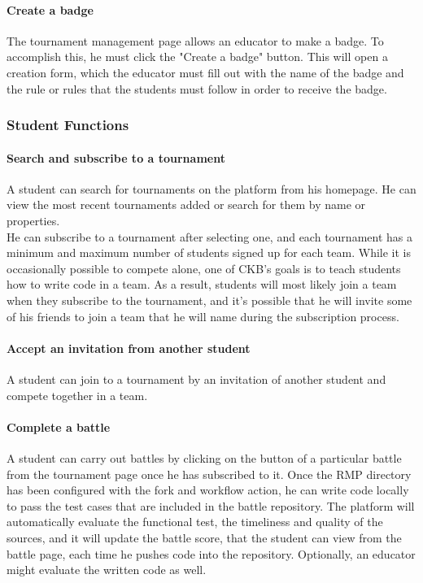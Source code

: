 \paragraph{Create a badge}
The tournament management page allows an educator to make a badge. To accomplish this, he must click the "Create a badge" button. This will open a creation form, which the educator must fill out with the name of the badge and the rule 
or rules that the students must follow in order to receive the badge.

\subsubsection{Student Functions}

\paragraph{Search and subscribe to a tournament}
A student can search for tournaments on the platform from his homepage. He can view the most recent tournaments added or search for them by name or properties.\\
He can subscribe to a tournament after selecting one, and each tournament has a minimum and maximum number of students signed up for each team. While it is occasionally possible to compete alone, one of CKB's goals is to teach 
students how to write code in a team. As a result, students will most likely join a team when they subscribe to the tournament, and it's possible that he will invite some of his friends to join a team that he will name during the 
subscription process.

\paragraph{Accept an invitation from another student}
A student can join to a tournament by an invitation of another student and compete together in a team.

\paragraph{Complete a battle}
A student can carry out battles by clicking on the button of a particular battle from the tournament page once he has subscribed to it. Once the RMP directory has been configured with the fork and workflow action, he can write code 
locally to pass the test cases that are included in the battle repository. The platform will automatically evaluate the functional test, the timeliness and quality of the sources, and it will update the battle score, that the student 
can view from the battle page, each time he pushes code into the repository. Optionally, an educator might evaluate the written code as well.

